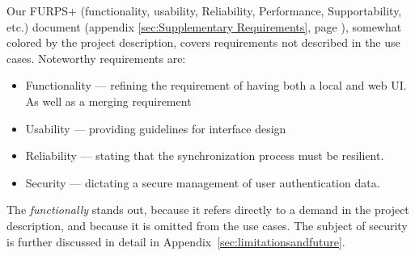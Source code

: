 Our FURPS+ (functionality, usability, Reliability, Performance, Supportability, etc.) document (appendix \ref{sec:Supplementary Requirements}, page \pageref{sec:Supplementary Requirements}), somewhat colored by the project description, covers requirements not described in the use cases. 
Noteworthy requirements are: 
\begin{itemize}
\item Functionality --- refining the requirement of having both a local and web UI. As well as a merging requirement
\item Usability --- providing guidelines for interface design
\item Reliability --- stating that the synchronization process must be resilient.
\item Security --- dictating a secure management of user authentication data.
\end{itemize}
The \emph{functionally} stands out, because it refers directly to a demand in the project description, and because it is omitted from the use cases.
The subject of security is further discussed in detail in Appendix~\ref{sec:limitationsandfuture}.